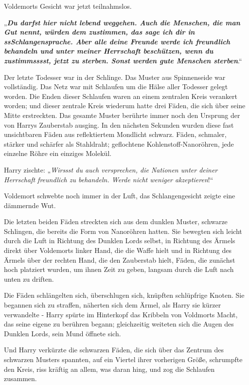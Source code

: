 {Voldemorts Gesicht war jetzt teilnahmslos.

„\textbf{\emph{Du darfst hier nicht lebend weggehen. Auch die Menschen, die man Gut nennt, würden dem zustimmen, das sage ich dir in ssSchlangensprache. Aber alle deine Freunde werde ich freundlich behandeln und unter meiner Herrschaft beschützen, wenn du zustimmsssst, jetzt zu sterben. Sonst werden gute Menschen sterben}}.“

Der letzte Todesser war in der Schlinge. Das Muster aus Spinnenseide war vollständig. Das Netz war mit Schlaufen um die Hälse aller Todesser gelegt worden. Die Enden dieser Schlaufen waren an einem zentralen Kreis verankert worden; und dieser zentrale Kreis wiederum hatte drei Fäden, die sich über seine Mitte erstreckten. Das gesamte Muster berührte immer noch den Ursprung der von Harrys Zauberstab ausging. In den nächsten Sekunden wurden diese fast unsichtbaren Fäden aus reflektiertem Mondlicht schwarz. Fäden, schmaler, stärker und schärfer als Stahldraht; geflochtene Kohlenstoff-Nanoröhren, jede einzelne Röhre ein einziges Molekül.

Harry zischte: „\emph{Wirssst du auch versprechen, die Nationen unter deiner Herrschaft freundlich zu behandeln. Werde nicht weniger akzeptieren}!“

Voldemort schwebte noch immer in der Luft, das Schlangengesicht zeigte eine dämmernde Wut.

Die letzten beiden Fäden streckten sich aus dem dunklen Muster, schwarze Schlingen, die bereits die Form von Nanoröhren hatten. Sie bewegten sich leicht durch die Luft in Richtung des Dunklen Lords selbst, in Richtung des Ärmels direkt über Voldemorts linker Hand, die die Waffe hielt und in Richtung des Ärmels über der rechten Hand, die den Zauberstab hielt, Fäden, die zunächst hoch platziert wurden, um ihnen Zeit zu geben, langsam durch die Luft nach unten zu driften.

Die Fäden schlängelten sich, überschlugen sich, knüpften schlüpfrige Knoten. Sie begannen sich zu straffen, näherten sich dem Ärmel, als Harry sie kürzer verwandelte - Harry spürte im Hinterkopf das Kribbeln von Voldmorts Macht, das seine eigene zu berühren begann; gleichzeitig weiteten sich die Augen des Dunklen Lords, sein Mund öffnete sich.

Und Harry verkürzte die schwarzen Fäden, die sich über das Zentrum des schwarzen Musters spannten, auf ein Viertel ihrer vorherigen Größe, schrumpfte den Kreis, riss kräftig an allem, was daran hing, und zog die Schlaufen zusammen.

}
